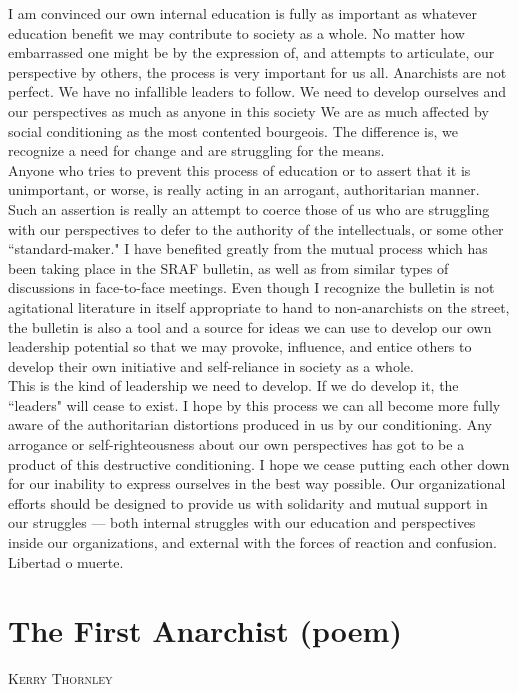 \documentclass[12pt, onecolumn, letterpaper, oneside]{book}
\makeatletter
\newcommand\chapterauthor[1]{\authortoc{#1}\printchapterauthor{#1}}
\newcommand{\printchapterauthor}[1]{%
  {\parindent0pt\vspace*{-25pt}%
  \linespread{1.1}\large\scshape#1%
  \par\nobreak\vspace*{35pt}}
  \@afterheading%
}
\newcommand{\authortoc}[1]{%
  \addtocontents{toc}{\vskip-10pt}%
  \addtocontents{toc}{%
    \protect\contentsline{chapter}%
    {\hskip1.3em\mdseries\scshape\protect\scriptsize#1}{}{}}
  \addtocontents{toc}{\vskip5pt}%
}
\makeatother
\begin{document}
I am convinced our own internal education is fully as important as whatever education benefit we may contribute to society as a whole. No matter how embarrassed one might be by the expression of, and attempts to articulate, our perspective by others, the process is very important for us all. Anarchists are not perfect. We have no infallible leaders to follow. We need to develop ourselves and our perspectives as much as anyone in this society We are as much affected by social conditioning as the most contented bourgeois. The difference is, we recognize a need for change and are struggling for the means.\\
Anyone who tries to prevent this process of education or to assert that it is unimportant, or worse, is really acting in an arrogant, authoritarian manner. Such an assertion is really an attempt to coerce those of us who are struggling with our perspectives to defer to the authority of the intellectuals, or some other ``standard-maker." I have benefited greatly from the mutual process which has been taking place in the SRAF bulletin, as well as from similar types of discussions in face-to-face meetings. Even though I recognize the bulletin is not agitational literature in itself appropriate to hand to non-anarchists on the street, the bulletin is also a tool and a source for ideas we can use to develop our own leadership potential so that we may provoke, influence, and entice others to develop their own initiative and self-reliance in society as a whole.\\
This is the kind of leadership we need to develop. If we do develop it, the ``leaders" will cease to exist. I hope by this process we can all become more fully aware of the authoritarian distortions produced in us by our conditioning. Any arrogance or self-righteousness about our own perspectives has got to be a product of this destructive conditioning. I hope we cease putting each other down for our inability to express ourselves in the best way possible. Our organizational efforts should be designed to provide us with solidarity and mutual support in our struggles --- both internal struggles with our education and perspectives inside our organizations, and external with the forces of reaction and confusion. Libertad o muerte.


\chapter{The First Anarchist (poem)}
\chapterauthor{Kerry Thornley}
\end{document}
